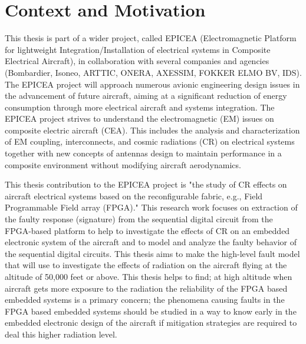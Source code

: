 

\section{Context and Motivation}
\label{intro}

This thesis is part of a wider project, called EPICEA (Electromagnetic Platform for lightweight 
Integration/Installation of electrical systems in Composite Electrical Aircraft), in collaboration with several 
companies and agencies (Bombardier, Isoneo, ARTTIC, ONERA, AXESSIM, FOKKER ELMO BV, IDS). The EPICEA project will approach
numerous avionic engineering design issues in the advancement of future aircraft, aiming at a significant
reduction of energy consumption through more electrical aircraft and systems integration. The EPICEA project strives to understand the electromagnetic (EM) issues on composite electric aircraft (CEA). This includes the analysis
and characterization of EM coupling, interconnects, and cosmic radiations (CR) on electrical systems together
with new concepts of antennas design to maintain performance in a composite environment without modifying
aircraft aerodynamics.

This thesis contribution to the EPICEA project is "the study of CR effects on aircraft electrical systems based on the reconfigurable fabric, e.g., Field Programmable Field array (FPGA)." This research work focuses on extraction of the faulty response (signature) from the sequential digital circuit from the FPGA-based platform to help to investigate the effects of CR on an embedded electronic system of the aircraft and to model and analyze the faulty behavior of the sequential digital circuits. This thesis aims to make the high-level fault model that will use to investigate the effects of radiation on the aircraft flying at the altitude of 50,000 feet or above. This thesis helps to find; at high altitude when aircraft gets more exposure to the radiation the reliability of the FPGA based embedded systems is a primary concern; the phenomena causing faults in the FPGA based embedded systems should be studied in a way to know early in the embedded electronic design of the aircraft if mitigation strategies are required to deal this higher radiation level. 

